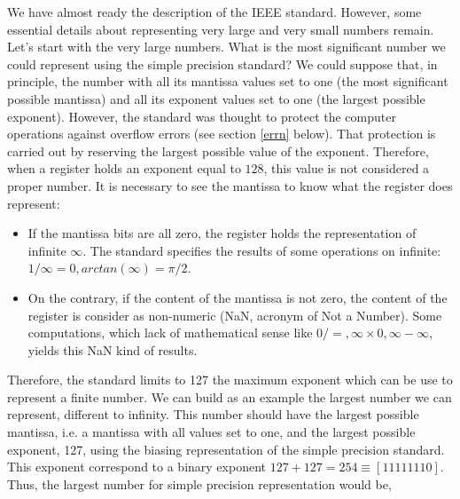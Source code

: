 \begin{paracol}{2}
We have almost ready the description of the IEEE standard. However, some essential details about representing very large and very small numbers remain. Let's start with the very large numbers. What is the most significant number we could represent using the simple precision standard? We could suppose that, in principle, the number with all its mantissa values set to one (the most significant possible mantissa) and all its exponent values set to one (the largest possible exponent). However, the standard was thought to protect the computer operations against overflow errors (see section \ref{errn} below). That protection is carried out by reserving the largest possible value of the exponent. Therefore, when a register holds an exponent equal to $128$, this value is not considered a proper number. It is necessary to see the mantissa to know what the register does represent:
\begin{itemize}
	\item If the mantissa bits are all zero, the register holds the representation of infinite $\infty$. The standard specifies the results of some operations on infinite: $1/\infty = 0, arctan(\infty) = \pi/2$.
	\item On the contrary, if the content of the mantissa is not zero, the content of the register is consider as non-numeric (NaN, acronym of Not a Number). Some computations, which lack of mathematical sense like $0/=, \infty\times 0, \infty -\infty$, yields this NaN kind of results.      
\end{itemize}       
 
 Therefore, the standard limits to 127 the maximum exponent which can be use to represent a finite number.  We can build as an example the largest number we can represent, different to infinity. This number should have the largest possible mantissa, i.e. a mantissa with all values set to one, and the largest possible exponent, 127, using the biasing representation of the simple precision standard. This exponent correspond to a binary exponent $127+127=254 \equiv [11111110]$. Thus, the largest number for simple precision representation would be, 
\end{paracol}

